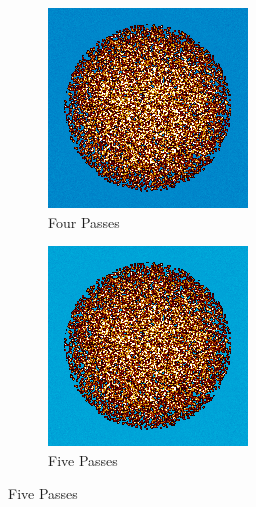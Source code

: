 \begin{figure}[H]\ContinuedFloat
\centering

\begin{subfigure}{0.45\textwidth}
  \includegraphics[width=0.95\linewidth]{figures/burn-20-bstep4}
  \caption{Four Passes}
  \label{fig:bstep4}
\end{subfigure}%
%
\begin{subfigure}{0.45\textwidth}
  \includegraphics[width=0.95\linewidth]{figures/burn-20-bstep5}
  \caption{Five Passes}
  \label{fig:bstep5}
\end{subfigure}%


\end{figure}
